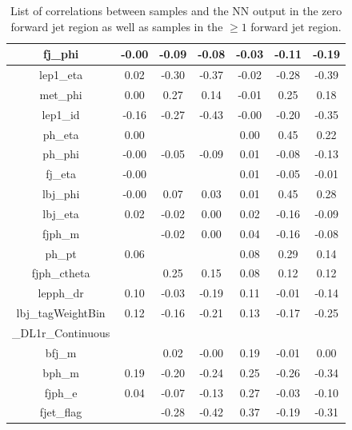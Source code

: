 \begin{table}[htbp]
\begin{tabular}{c|c c c|c c c}
        fj\_phi                           & -0.00 &     -0.09 &  -0.08 & -0.03 &     -0.11 &  -0.19 \\ \hline
        lep1\_eta                         &  0.02 &     -0.30 &  -0.37 & -0.02 &     -0.28 &  -0.39 \\ \hline
        met\_phi                          &  0.00 &      0.27 &   0.14 & -0.01 &      0.25 &   0.18 \\ \hline
        lep1\_id                          & -0.16 &     -0.27 &  -0.43 & -0.00 &     -0.20 &  -0.35 \\ \hline
        ph\_eta                           &  0.00 &        &     &  0.00 &      0.45 &   0.22 \\ \hline
        ph\_phi                           & -0.00 &     -0.05 &  -0.09 &  0.01 &     -0.08 &  -0.13 \\ \hline
        fj\_eta                           & -0.00 &        &     &  0.01 &     -0.05 &  -0.01 \\ \hline
        lbj\_phi                          & -0.00 &      0.07 &   0.03 &  0.01 &      0.45 &   0.28 \\ \hline
        lbj\_eta                          &  0.02 &     -0.02 &   0.00 &  0.02 &     -0.16 &  -0.09 \\ \hline
        fjph\_m                           &    &     -0.02 &   0.00 &  0.04 &     -0.16 &  -0.08 \\ \hline
        ph\_pt                            &  0.06 &        &     &  0.08 &      0.29 &   0.14 \\ \hline
        fjph\_ctheta                      &    &      0.25 &   0.15 &  0.08 &      0.12 &   0.12 \\ \hline
        lepph\_dr                         &  0.10 &     -0.03 &  -0.19 &  0.11 &     -0.01 &  -0.14 \\ \hline
        lbj\_tagWeightBin &  0.12 &     -0.16 &  -0.21 &  0.13 &     -0.17 &  -0.25 \\ 
        \_DL1r\_Continuous &&&&&&\\ \hline
        bfj\_m                            &    &      0.02 &  -0.00 &  0.19 &     -0.01 &   0.00 \\ \hline
        bph\_m                            &  0.19 &     -0.20 &  -0.24 &  0.25 &     -0.26 &  -0.34 \\ \hline
        fjph\_e                           &  0.04 &     -0.07 &  -0.13 &  0.27 &     -0.03 &  -0.10 \\ \hline
        fjet\_flag                        &    &     -0.28 &  -0.42 &  0.37 &     -0.19 &  -0.31 \\ \hline
        \bottomrule
        \end{tabular}
    \caption{List of correlations between samples and the NN output in the zero forward jet region as well as samples in the $\geq 1$ forward jet region.}
    \label{tab:corrAll}
\end{table}
